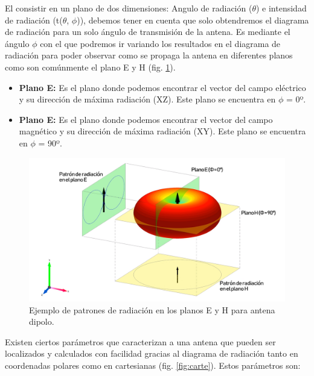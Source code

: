 \par El consistir en un plano de dos dimensiones: Angulo de radiación ($\theta$) e intensidad de radiación (t($\theta $, $\phi $)), debemos tener en cuenta que solo obtendremos el diagrama de radiación para un solo ángulo de transmisión de la antena. Es mediante el ángulo $\phi $ con el que podremos ir variando los resultados en el diagrama de radiación para poder observar como se propaga la antena en diferentes planos como son comúnmente el plano E y H (fig. \ref{fig:pattern}).

\begin{itemize}
\item \textbf{Plano E: }Es el plano donde podemos encontrar el vector del campo eléctrico y su dirección de máxima radiación (XZ). Este plano se encuentra en $\phi $ = 0º. 

\item \textbf{Plano E: }Es el plano donde podemos encontrar el vector del campo magnético y su dirección de máxima radiación (XY). Este plano se encuentra en $\phi $ = 90º.
\end{itemize}

\begin{figure}[h]
    \centering
        \includegraphics[width=15cm]{archivos/radiacion/pattern2}
        \caption{Ejemplo de patrones de radiación en los planos E y H para antena dipolo. \cite{Yavuz2015}}
        \label{fig:pattern}
\end{figure}

\par Existen ciertos parámetros que caracterizan a una antena que pueden ser localizados y calculados con facilidad gracias al diagrama de radiación tanto en coordenadas polares como en cartesianas (fig. \ref{fig:carte}). Estos parámetros son:

